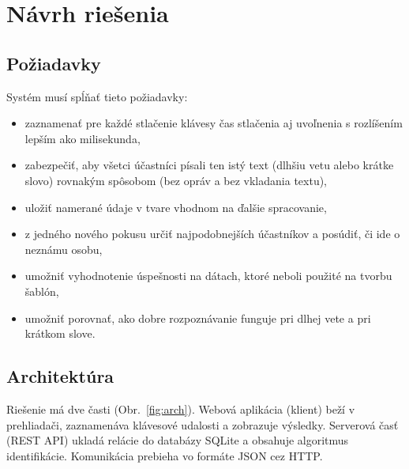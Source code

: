 \section{Návrh riešenia}
\label{sec:navrh}

\subsection{Požiadavky}

Systém musí spĺňať tieto požiadavky:
\begin{itemize}
  \item zaznamenať pre každé stlačenie klávesy čas stlačenia aj uvoľnenia
        s rozlíšením lepším ako milisekunda,
  \item zabezpečiť, aby všetci účastníci písali ten istý text (dlhšiu vetu
        alebo krátke slovo) rovnakým spôsobom (bez opráv a bez vkladania
        textu),
  \item uložiť namerané údaje v tvare vhodnom na ďalšie spracovanie,
  \item z jedného nového pokusu určiť najpodobnejších účastníkov a posúdiť,
        či ide o neznámu osobu,
  \item umožniť vyhodnotenie úspešnosti na dátach, ktoré neboli použité
        na tvorbu šablón,
  \item umožniť porovnať, ako dobre rozpoznávanie funguje pri dlhej vete
        a pri krátkom slove.
\end{itemize}

\subsection{Architektúra}

Riešenie má dve časti (Obr.~\ref{fig:arch}). Webová aplikácia
(klient) beží v prehliadači, zaznamenáva klávesové udalosti a zobrazuje
výsledky. Serverová časť (REST API) ukladá relácie do databázy SQLite
a obsahuje algoritmus identifikácie. Komunikácia prebieha vo formáte JSON
cez HTTP.

